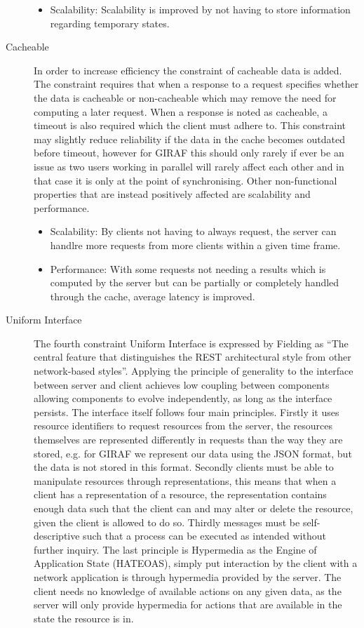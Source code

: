 \begin{description}
\begin{itemize}
        \item Scalability: Scalability is improved by not having to store information regarding temporary states.
    \end{itemize}
    \item [Cacheable] In order to increase efficiency the constraint of cacheable data is added.
    The constraint requires that when a response to a request specifies whether the data is cacheable or non-cacheable which may remove the need for computing a later request.
    When a response is noted as cacheable, a timeout is also required which the client must adhere to.
    This constraint may slightly reduce reliability if the data in the cache becomes outdated before timeout, however for GIRAF this should only rarely if ever be an issue as two users working in parallel will rarely affect each other and in that case it is only at the point of synchronising.
    Other non-functional properties that are instead positively affected are scalability and performance.
    \begin{itemize}
        \item Scalability: By clients not having to always request, the server can handlre more requests from more clients within a given time frame.
        \item Performance: With some requests not needing a results which is computed by the server but can be partially or completely handled through the cache, average latency is improved.
    \end{itemize}
    \item [Uniform Interface] The fourth constraint Uniform Interface is expressed by Fielding as \enquote{The central feature that distinguishes the REST architectural style from other network-based styles}\citep{fielding2000rest}.
    Applying the principle of generality to the interface between server and client achieves low coupling between components allowing components to evolve independently, as long as the interface persists.
    The interface itself follows four main principles.
    Firstly it uses resource identifiers to request resources from the server, the resources themselves are represented differently in requests than the way they are stored, e.g. for GIRAF we represent our data using the JSON format, but the data is not stored in this format.
    Secondly clients must be able to manipulate resources through representations, this means that when a client has a representation of a resource, the representation contains enough data such that the client can and may alter or delete the resource, given the client is allowed to do so.
    Thirdly messages must be self-descriptive such that a process can be executed as intended without further inquiry.
    The last principle is Hypermedia as the Engine of Application State (HATEOAS), simply put interaction by the client with a network application is through hypermedia provided by the server.
    The client needs no knowledge of available actions on any given data, as the server will only provide hypermedia for actions that are available in the state the resource is in.


\end{description}

